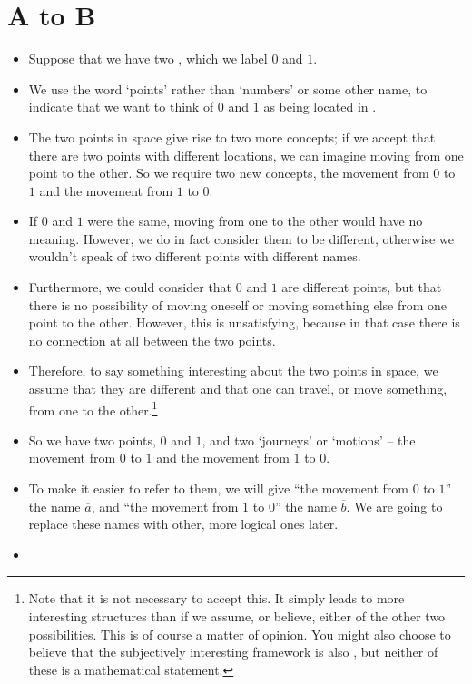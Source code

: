 \chapter{A to B}
\label{atob}

\begin{itemize}
\item
Suppose that we have two , which we label $0$ and $1$.
\item
We use the word `points' rather than `numbers' or some other name, to indicate that we want to think of $0$ and $1$ as being located in .
\item
The two points in space give rise to two more concepts; if we accept that there are two points with different locations, we can imagine moving from one point to the other. So we require two new concepts, the movement from $0$ to $1$ and the movement from $1$ to $0$. 
\item
If $0$ and $1$ were the same, moving from one to the other would have no meaning. However, we do in fact consider them to be different, otherwise we wouldn't speak of two different points with different names.
\item
Furthermore, we could consider that $0$ and $1$ are different points, but that there is no possibility of moving oneself or moving something else from one point to the other. However, this is unsatisfying, because in that case there is no connection at all between the two points.
\item
Therefore, to say something interesting about the two points in space, we assume that they are different and that one can travel, or move something, from one to the other.\footnote{Note that it is not necessary to accept this. It simply leads to more interesting structures than if we assume, or believe, either of the other two possibilities. This is of course a matter of opinion. You might also choose to believe that the subjectively interesting framework is also , but neither of these is a mathematical statement.}
\item
So we have two points, $0$ and $1$, and two `journeys' or `motions' -- the movement from $0$ to $1$ and the movement from $1$ to $0$. 
\item
To make it easier to refer to them, we will give ``the movement from $0$ to $1$'' the name $\overline{a}$, and ``the movement from $1$ to $0$'' the name $\overline{b}$. We are going to replace these names with other, more logical ones later.
\item  

\end{itemize}
